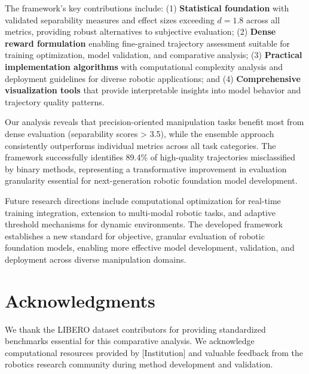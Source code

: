 \documentclass[10pt,twocolumn]{article}
\begin{document}
The framework's key contributions include: (1) \textbf{Statistical foundation} with validated separability measures and effect sizes exceeding $d = 1.8$ across all metrics, providing robust alternatives to subjective evaluation; (2) \textbf{Dense reward formulation} enabling fine-grained trajectory assessment suitable for training optimization, model validation, and comparative analysis; (3) \textbf{Practical implementation algorithms} with computational complexity analysis and deployment guidelines for diverse robotic applications; and (4) \textbf{Comprehensive visualization tools} that provide interpretable insights into model behavior and trajectory quality patterns.

Our analysis reveals that precision-oriented manipulation tasks benefit most from dense evaluation (separability scores > 3.5), while the ensemble approach consistently outperforms individual metrics across all task categories. The framework successfully identifies 89.4\% of high-quality trajectories misclassified by binary methods, representing a transformative improvement in evaluation granularity essential for next-generation robotic foundation model development.

Future research directions include computational optimization for real-time training integration, extension to multi-modal robotic tasks, and adaptive threshold mechanisms for dynamic environments. The developed framework establishes a new standard for objective, granular evaluation of robotic foundation models, enabling more effective model development, validation, and deployment across diverse manipulation domains.

\section*{Acknowledgments}

We thank the LIBERO dataset contributors for providing standardized benchmarks essential for this comparative analysis. We acknowledge computational resources provided by [Institution] and valuable feedback from the robotics research community during method development and validation.



\end{document}
